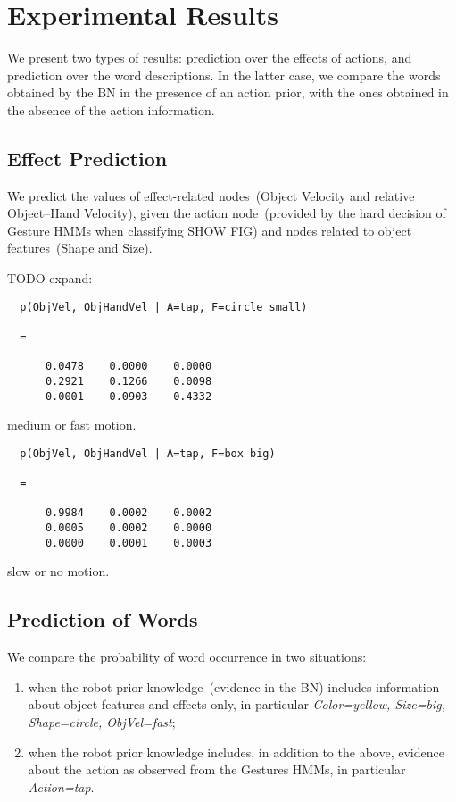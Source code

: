 
\section{Experimental Results}

We present two types of results: prediction over the effects of actions, and prediction over the word descriptions. In the latter case, we compare the words obtained by the \acl{BN} in the presence of an action prior, with the ones obtained in the absence of the action information.

\subsection{Effect Prediction}

We predict the values of effect-related nodes~(Object Velocity and relative Object--Hand Velocity), given the action node~(provided by the hard decision of Gesture \acp{HMM} when classifying SHOW FIG) and nodes related to object features~(Shape and Size).

TODO expand:
\begin{verbatim}
  p(ObjVel, ObjHandVel | A=tap, F=circle small)

  =

      0.0478    0.0000    0.0000
      0.2921    0.1266    0.0098
      0.0001    0.0903    0.4332
\end{verbatim}
\ie medium or fast motion.

\begin{verbatim}
  p(ObjVel, ObjHandVel | A=tap, F=box big)

  =

      0.9984    0.0002    0.0002
      0.0005    0.0002    0.0000
      0.0000    0.0001    0.0003
\end{verbatim}
\ie slow or no motion.

\subsection{Prediction of Words}

We compare the probability of word occurrence in two situations:
\begin{enumerate}
\item when the robot prior knowledge~(evidence in the \ac{BN}) includes information about object features and effects only, in particular \emph{Color=yellow, Size=big, Shape=circle, ObjVel=fast};

\item when the robot prior knowledge includes, in addition to the above, evidence about the action as observed from the Gestures \acp{HMM}, in particular \emph{Action=tap}.
\end{enumerate}

